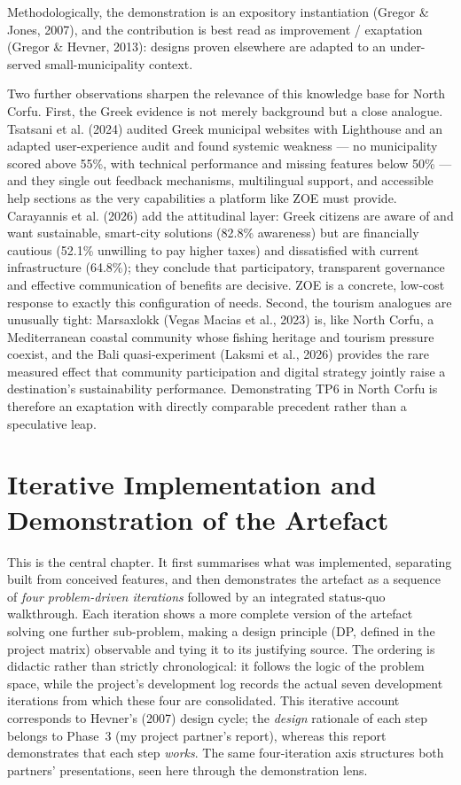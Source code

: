 \documentclass[11pt,a4paper]{article}
\begin{document}
Methodologically, the demonstration is an expository instantiation (Gregor \& Jones, 2007), and the contribution is best read as improvement / exaptation (Gregor \& Hevner, 2013): designs proven elsewhere are adapted to an under-served small-municipality context.

Two further observations sharpen the relevance of this knowledge base for North Corfu. First, the Greek evidence is not merely background but a close analogue. Tsatsani et al. (2024) audited Greek municipal websites with Lighthouse and an adapted user-experience audit and found systemic weakness --- no municipality scored above 55\%, with technical performance and missing features below 50\% --- and they single out feedback mechanisms, multilingual support, and accessible help sections as the very capabilities a platform like ZOE must provide. Carayannis et al. (2026) add the attitudinal layer: Greek citizens are aware of and want sustainable, smart-city solutions (82.8\% awareness) but are financially cautious (52.1\% unwilling to pay higher taxes) and dissatisfied with current infrastructure (64.8\%); they conclude that participatory, transparent governance and effective communication of benefits are decisive. ZOE is a concrete, low-cost response to exactly this configuration of needs. Second, the tourism analogues are unusually tight: Marsaxlokk (Vegas Macias et al., 2023) is, like North Corfu, a Mediterranean coastal community whose fishing heritage and tourism pressure coexist, and the Bali quasi-experiment (Laksmi et al., 2026) provides the rare measured effect that community participation and digital strategy jointly raise a destination's sustainability performance. Demonstrating TP6 in North Corfu is therefore an exaptation with directly comparable precedent rather than a speculative leap.

\section{Iterative Implementation and Demonstration of the Artefact}

This is the central chapter. It first summarises what was implemented, separating built from conceived features, and then demonstrates the artefact as a sequence of \emph{four problem-driven iterations} followed by an integrated status-quo walkthrough. Each iteration shows a more complete version of the artefact solving one further sub-problem, making a design principle (DP, defined in the project matrix) observable and tying it to its justifying source. The ordering is didactic rather than strictly chronological: it follows the logic of the problem space, while the project's development log records the actual seven development iterations from which these four are consolidated. This iterative account corresponds to Hevner's (2007) design cycle; the \emph{design} rationale of each step belongs to Phase~3 (my project partner's report), whereas this report demonstrates that each step \emph{works}. The same four-iteration axis structures both partners' presentations, seen here through the demonstration lens.
\end{document}
